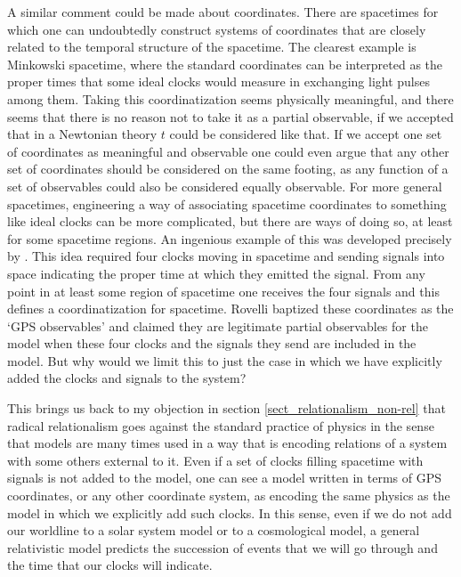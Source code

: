 \documentclass[12 pt]{article}
\begin{document}
A similar comment could be made about coordinates. There are spacetimes for which one can undoubtedly construct systems of coordinates that are closely related to the temporal structure of the spacetime. The clearest example is Minkowski spacetime, where the standard coordinates can be interpreted as the proper times that some ideal clocks would measure in exchanging light pulses among them. Taking this coordinatization seems physically meaningful, and there seems that there is no reason not to take it as a partial observable, if we accepted that in a Newtonian theory $t$ could be considered like that. If we accept one set of coordinates as meaningful and observable one could even argue that any other set of coordinates should be considered on the same footing, as any function of a set of observables could also be considered equally observable. For more general spacetimes, engineering a way of associating spacetime coordinates to something like ideal clocks can be more complicated, but there are ways of doing so, at least for some spacetime regions. An ingenious example of this was developed precisely by \cite{Rovelli2002a}. This idea required four clocks moving in spacetime and sending signals into space indicating the proper time at which they emitted the signal. From any point in at least some region of spacetime one receives the four signals and this defines a coordinatization for spacetime. Rovelli baptized these coordinates as the `GPS observables' and claimed they are legitimate partial observables for the model when these four clocks and the signals they send are included in the model. But why would we limit this to just the case in which we have explicitly added the clocks and signals to the system?

This brings us back to my objection in section \ref{sect_relationalism_non-rel} that radical relationalism goes against the standard practice of physics in the sense that models are many times used in a way that is encoding relations of a system with some others external to it. Even if a set of clocks filling spacetime with signals is not added to the model, one can see a model written in terms of GPS coordinates, or any other coordinate system, as encoding the same physics as the model in which we explicitly add such clocks. In this sense, even if we do not add our worldline to a solar system model or to a cosmological model, a general relativistic model predicts the succession of events that we will go through and the time that our clocks will indicate. 
\end{document}
